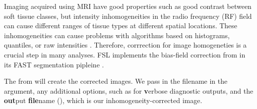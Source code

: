 Imaging acquired using MRI have good properties such as good contrast between soft tissue classes, but intensity inhomogeneities in the radio frequency (RF) field can cause different ranges of tissue types at different spatial locations.  These inhomogeneities can cause problems with algorithms based on histograms, quantiles, or raw intensities \citep{zhang_segmentation_2001}.  Therefore, corrrection for image homogeneties is a crucial step in many analyses.  FSL implements the bias-field correction from \citet{guillemaud_estimating_1997} in its FAST segmentation pipleine \citep{zhang_segmentation_2001}.  
 






The  from  will create the corrected images.  We pass in the filename in the  argument, any additional options, such as  for {\bf v}erbose diagnostic outputs, and the {\bf out}put {\bf file}name (), which is our inhomogeneity-corrected image.

\begin{knitrout}
\color{fgcolor}\begin{kframe}
\begin{alltt}
 \hlstd{)}
\end{alltt}
\end{kframe}
\end{knitrout}

\begin{knitrout}
\color{fgcolor}\begin{kframe}
\begin{alltt}
\hlstd{(} \hlstd{=} \hlstd{,} \hlstd{=} \hlstd{,}\hlstd{=} \hlstd{,)}
\end{alltt}
\end{kframe}
\end{knitrout}


\begin{knitrout}
\color{fgcolor}\begin{kframe}
\begin{alltt}
   
   \hlkwb{=} \hlopt{$}
   \hlkwb{=} \hlopt{$}
   \hlstd{=} \hlstd{,} 
\hlstd{\}}
\end{alltt}
\end{kframe}
\end{knitrout}

